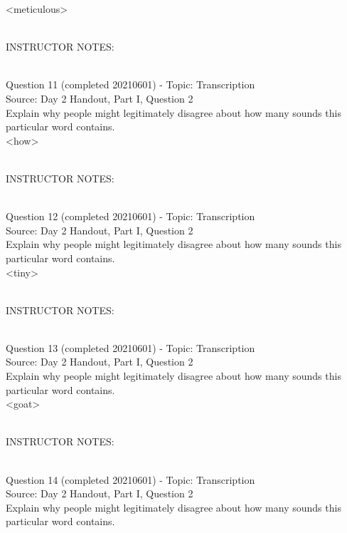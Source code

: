 \documentclass[12pt]{article}
\begin{document}
<meticulous>


~\\
INSTRUCTOR NOTES: 


~\\

{\large Question 11} (completed 20210601) - Topic: Transcription\\
Source: Day 2 Handout, Part I, Question 2\\

Explain why people might legitimately disagree about how many sounds this particular word contains.\\

<how>


~\\
INSTRUCTOR NOTES: 


~\\

{\large Question 12} (completed 20210601) - Topic: Transcription\\
Source: Day 2 Handout, Part I, Question 2\\

Explain why people might legitimately disagree about how many sounds this particular word contains.\\

<tiny>


~\\
INSTRUCTOR NOTES: 


~\\

{\large Question 13} (completed 20210601) - Topic: Transcription\\
Source: Day 2 Handout, Part I, Question 2\\

Explain why people might legitimately disagree about how many sounds this particular word contains.\\

<goat>


~\\
INSTRUCTOR NOTES: 


~\\

{\large Question 14} (completed 20210601) - Topic: Transcription\\
Source: Day 2 Handout, Part I, Question 2\\

Explain why people might legitimately disagree about how many sounds this particular word contains.\\
\end{document}
